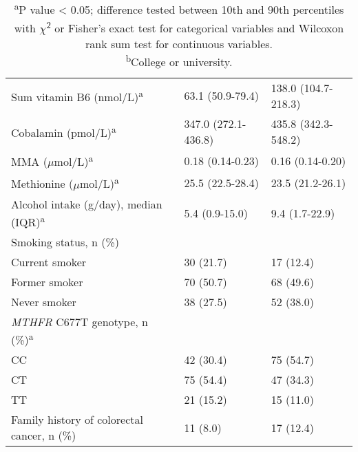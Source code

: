 \begin{center}
\begin{table}[h]
\begin{adjustbox}{width=\textwidth}
\begin{tabular}{L{7.6cm}C{4.0cm}C{3.6cm}}
\quad Sum vitamin B6 (nmol/L)\textsuperscript{a} & 63.1 (50.9-79.4) & 138.0 (104.7-218.3)\\
\quad Cobalamin (pmol/L)\textsuperscript{a} & 347.0 (272.1-436.8) & 435.8 (342.3-548.2)\\
\quad MMA ($\mu$mol/L)\textsuperscript{a} & 0.18 (0.14-0.23) & 0.16 (0.14-0.20)\\
\quad Methionine ($\mu$mol/L)\textsuperscript{a} & 25.5 (22.5-28.4) & 23.5 (21.2-26.1)\\
Alcohol intake (g/day), median (IQR)\textsuperscript{a} & 5.4 (0.9-15.0) & 9.4 (1.7-22.9)\\
Smoking status, n (\%) &~ &~\\
\quad Current smoker & 30 (21.7) & 17 (12.4)\\
\quad Former smoker & 70 (50.7) & 68 (49.6)\\
\quad Never smoker & 38 (27.5) & 52 (38.0)\\
{\textit{MTHFR} C677T genotype}, n (\%)\textsuperscript{a} &~ &~\\
\quad CC & 42 (30.4) & 75 (54.7)\\ \quad CT & 75 (54.4) & 47 (34.3)\\ \quad TT & 21 (15.2) & 15 (11.0)\\
Family history of colorectal cancer, n (\%) & 11 (8.0) & 17 (12.4)\\
\hline
\end{tabular}
\end{adjustbox}
\caption*{\footnotesize{\textsuperscript{a}P value < 0.05; difference tested between 10th and 90th percentiles with $\chi$\textsuperscript{2} or Fisher's exact test for categorical variables and Wilcoxon rank sum test for continuous variables. \\ \textsuperscript{b}College or university.}}
\end{table}
\end{center}


